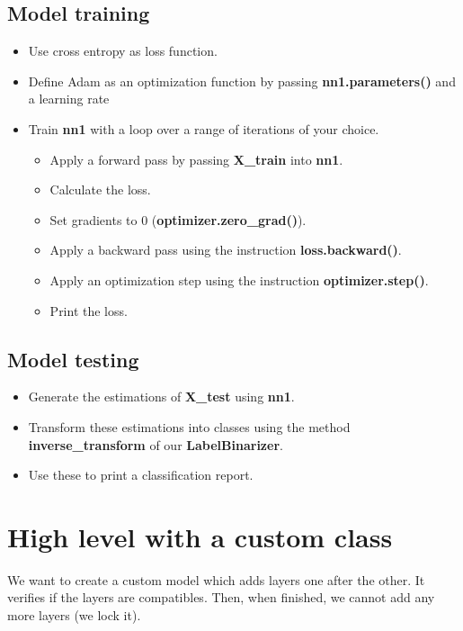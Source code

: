 \documentclass[11pt, a4paper]{article}
\begin{document}
\begin{multicols}{2}
	\subsection{Model training}
	
	\begin{itemize}  
		\item Use cross entropy as loss function.
		\item Define Adam as an optimization function by passing \textbf{nn1.parameters()} and a learning rate
		\item Train \textbf{nn1} with a loop over a range of iterations of your choice.
		\begin{itemize} 
			\item Apply a forward pass by passing \textbf{X\_train} into \textbf{nn1}.
			\item Calculate the loss.
			\item Set gradients to 0 (\textbf{optimizer.zero\_grad()}).
			\item Apply a backward pass using the instruction \textbf{loss.backward()}.
			\item Apply an optimization step using the instruction \textbf{optimizer.step()}.
			\item Print the loss.
		\end{itemize}
	\end{itemize}
	
	\subsection{Model testing}
	\begin{itemize}  
		\item Generate the estimations of \textbf{X\_test} using \textbf{nn1}.
		\item Transform these estimations into classes using the method \textbf{inverse\_transform} of our \textbf{LabelBinarizer}.
		\item Use these to print a classification report.
	\end{itemize}
	
	\section{High level with a custom class}
	
	We want to create a custom model which adds layers one after the other.
	It verifies if the layers are compatibles.
	Then, when finished, we cannot add any more layers (we lock it).
	

\end{multicols}
\end{document}
